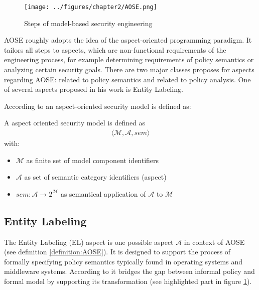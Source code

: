 \documentclass[twoside, openright, 12pt]{book}
\begin{document}
\begin{figure}[htb]
	\centering
	\texttt{[image: ../figures/chapter2/AOSE.png]}
	\caption{Steps of model-based security engineering \citep{Amthor18}}
	\label{fig:AOSE}
\end{figure}

\noindent
AOSE roughly adopts the idea of the aspect-oriented programming paradigm.
It tailors all steps to aspects, which are non-functional requirements of the engineering process, for example determining requirements of policy semantics or analyzing certain security goals.
There are two major classes \cite{Amthor18} proposes for aspects regarding AOSE: related to policy semantics and related to policy analysis.
One of several aspects proposed in his work is Entity Labeling.

According to \cite{Amthor18} an aspect-oriented security model is defined as:

\begin{xdefinition} 
A aspect oriented security model is defined as 
\begin{gather*}
\langle \mathcal{M},\mathcal{A},sem \rangle
\end{gather*}
with:

\vspace{-2mm}
\begin{itemize}
\setlength\itemsep{0em}
\item $\mathcal{M}$ as finite set of model component identifiers
\item $\mathcal{A}$ as set of semantic category identifiers (aspect)
\item $sem : \mathcal{A} \rightarrow 2^\mathcal{M}$ as semantical application of $\mathcal{A}$ to $\mathcal{M}$
\end{itemize}
\label{definition:AOSE}
\end{xdefinition}



\subsection{Entity Labeling}
\label{EL}
The Entity Labeling (EL) aspect is one possible aspect $\mathcal{A}$ in context of AOSE (see definition \ref{definition:AOSE}).
It is designed to support the process of formally specifying policy semantics typically found in operating systems and middleware systems.
According to \cite{Amthor18} it bridges the gap between informal policy and formal model by supporting its transformation (see highlighted part in figure \ref{fig:AOSE}).
\end{document}
